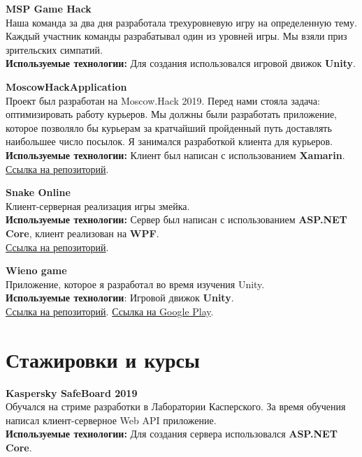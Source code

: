 \documentclass{resume}
\begin{document}
\item{\textbf{MSP Game Hack} \\
Наша команда за два дня разработала трехуровневую игру на определенную тему. Каждый участник команды разрабатывал один из уровней игры. Мы взяли приз зрительских симпатий. \\
\textbf{Используемые технологии:} Для создания использовался игровой движок \textbf{Unity}.}

\item{\textbf{MoscowHackApplication} \\
Проект был разработан на Moscow.Hack 2019. Перед нами стояла задача: оптимизировать работу курьеров. Мы должны были разработать приложение, которое позволяло бы курьерам за кратчайший пройденный путь доставлять наибольшее число посылок. Я занимался разработкой клиента для курьеров. \\
\textbf{Используемые технологии:} Клиент был написан с использованием \textbf{Xamarin}. \\
\href{https://github.com/SalavatD/MoscowHackApplication}{\color{blue}Ссылка на репозиторий}.}

\item{\textbf{Snake Online} \\
Клиент-серверная реализация игры змейка. \\
\textbf{Используемые технологии:} Сервер был написан с использованием \textbf{ASP.NET Core}, клиент реализован на \textbf{WPF}. \\
\href{https://github.com/SalavatD/Snake}{\color{blue}Ссылка на репозиторий}.}

\item{\textbf{Wieno game} \\
Приложение, которое я разработал во время изучения Unity. \\
\textbf{Используемые технологии}: Игровой движок \textbf{Unity}. \\
\href{https://github.com/SalavatD/Wieno}{\color{blue}Ссылка на репозиторий}. \href{https://play.google.com/store/apps/details?id=com.anytrash.wieno}{\color{blue}Ссылка на Google Play}.}
\resumeSubHeadingListEnd


\section{Стажировки и курсы}
\resumeSubHeadingListStart
\item{\textbf{Kaspersky SafeBoard 2019} \\
Обучался на стриме разработки в Лаборатории Касперского. За время обучения написал клиент-серверное Web API приложение. \\
\textbf{Используемые технологии:} Для создания сервера использовался \textbf{ASP.NET Core}.}
\resumeSubHeadingListEnd
\end{document}
